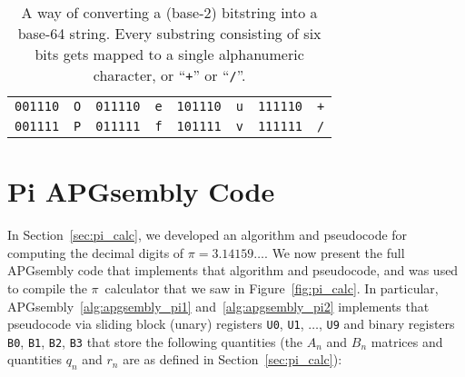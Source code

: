 \begin{table}[!htb]
\begin{center}
\begin{tabular}{cc|cc|cc|cc}
			\texttt{001110} & \texttt{O} & \texttt{011110} & \texttt{e} & \texttt{101110} & \texttt{u} & \texttt{111110} & \texttt{+} \\
			\texttt{001111} & \texttt{P} & \texttt{011111} & \texttt{f} & \texttt{101111} & \texttt{v} & \texttt{111111} & \texttt{/} \\\bottomrule
		\end{tabular}
		\caption{A way of converting a (base-2) bitstring into a base-64 string. Every substring consisting of six bits gets mapped to a single alphanumeric character, or ``\texttt{+}'' or ``\texttt{/}''.}\label{tab:base64}
	\end{center}
\end{table}


\section{Pi APGsembly Code}\label{sec:appendix_apg}

In Section~\ref{sec:pi_calc}, we developed an algorithm and pseudocode for computing the decimal digits of $\pi = 3.14159\ldots$. We now present the full APGsembly code that implements that algorithm and pseudocode, and was used to compile the $\pi$~calculator that we saw in Figure~\ref{fig:pi_calc}. In particular, APGsembly~\ref{alg:apgsembly_pi1} and~\ref{alg:apgsembly_pi2} implements that pseudocode via sliding block (unary) registers \texttt{U0}, \texttt{U1}, $\ldots$, \texttt{U9} and binary registers \texttt{B0}, \texttt{B1}, \texttt{B2}, \texttt{B3} that store the following quantities (the $A_n$ and $B_n$ matrices and quantities $q_n$ and $r_n$ are as defined in Section~\ref{sec:pi_calc}):\smallskip

